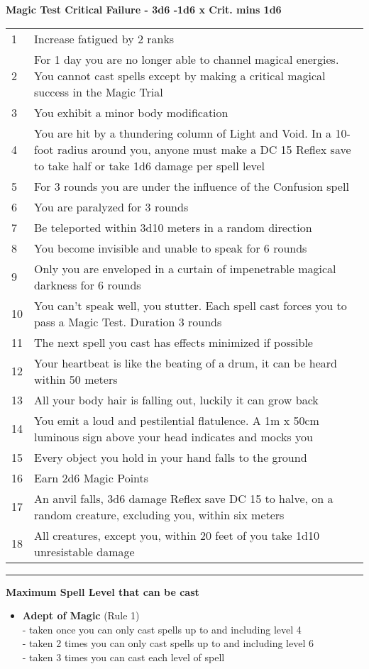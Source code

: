 \documentclass[a4paper,12 pt,openany]{book}
\newcommand{\linex}{\rule{\textwidth}{0.4pt}}
\begin{document}
\begin{textblock*}{13.5cm}
\textbf{Magic Test Critical Failure - 3d6 -1d6 x Crit. mins 1d6}
\begin{tabularx}{0.95\textwidth}{lX}
1 & Increase fatigued by 2 ranks\\
2 & For 1 day you are no longer able to channel magical energies. You cannot cast spells except by making a critical magical success in the Magic Trial\\
3 & You exhibit a minor body modification\\
4 & You are hit by a thundering column of Light and Void. In a 10-foot radius around you, anyone must make a DC 15 Reflex save to take half or take 1d6 damage per spell level\\
5 & ​​For 3 rounds you are under the influence of the Confusion spell\\
6 & You are paralyzed for 3 rounds\\
7 & Be teleported within 3d10 meters in a random direction\\
8 & You become invisible and unable to speak for 6 rounds\\
9 & Only you are enveloped in a curtain of impenetrable magical darkness for 6 rounds\\
10 & You can't speak well, you stutter. Each spell cast forces you to pass a Magic Test. Duration 3 rounds\\
11 & The next spell you cast has effects minimized if possible\\
12 & Your heartbeat is like the beating of a drum, it can be heard within 50 meters\\
13 & All your body hair is falling out, luckily it can grow back\\
14 & You emit a loud and pestilential flatulence. A 1m x 50cm luminous sign above your head indicates and mocks you\\
15 & Every object you hold in your hand falls to the ground\\
16 & Earn 2d6 Magic Points\\
17 & An anvil falls, 3d6 damage Reflex save DC 15 to halve, on a random creature, excluding you, within six meters\\
18 & All creatures, except you, within 20 feet of you take 1d10 unresistable damage
\end{tabularx}

\linex

\textbf{Maximum Spell Level that can be cast}

\begin{itemize}
\item
\textbf{Adept of Magic} (Rule 1) \\
- taken once you can only cast spells up to and including level 4\\
- taken 2 times you can only cast spells up to and including level 6\\
- taken 3 times you can cast each level of spell


\end{itemize}
\end{textblock*}
\end{document}
